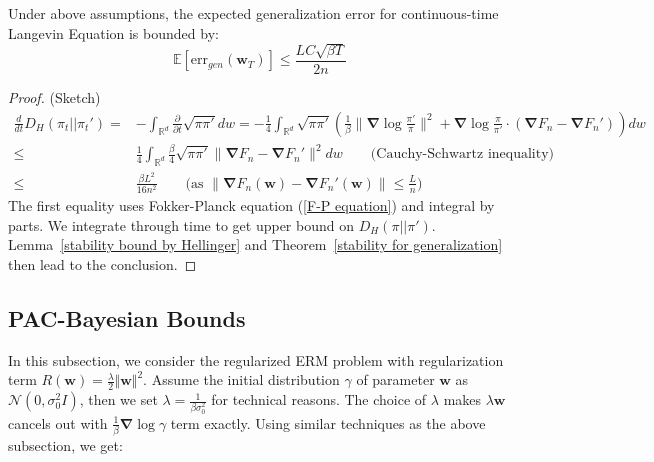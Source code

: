 \documentclass[final,12pt]{colt2018} %
\begin{document}
\begin{proposition}
\label{stability-bound-continuous}
  Under above assumptions, the expected generalization error for continuous-time Langevin Equation is bounded by:
  \begin{equation}
    \mathbb{E} [\mathrm{err}_{gen}(\bm{w}_T)]\leq \frac{LC\sqrt{\beta T}}{2n}
  \end{equation}
\end{proposition}
\begin{proof}(Sketch)
\begin{align*}
\frac{d}{dt}D_{H}(\pi_t||\pi_t')=&-\int_{\mathbb{R}^d} \frac{\partial }{\partial t}\sqrt{\pi \pi'}dw=-\frac{1}{4}\int_{\mathbb{R}^d}\sqrt{\pi \pi'}\left(\frac{1}{\beta}\|\bm{\nabla}\log\frac{\pi'}{\pi}\|^2+\bm{\nabla}\log\frac{\pi}{\pi'}\cdot(\bm{\nabla}F_n-\bm{\nabla}F_n')\right)dw\\
\leqslant & \frac{1}{4}\int_{\mathbb{R}^d}\frac{\beta}{4}\sqrt{\pi \pi'}\|\bm{\nabla}F_n-\bm{\nabla}F_n'\|^2dw \quad \quad \text{(Cauchy-Schwartz inequality)}\\
\leqslant & \frac{\beta L^2}{16n^2} \quad \quad \text{(as $\|\bm{\nabla}F_n(\bm{w})-\bm{\nabla}F_n'(\bm{w})\|\leqslant \frac{L}{n}$)}
\end{align*}
The first equality uses Fokker-Planck equation (\ref{F-P equation}) and integral by parts. We integrate through time to get upper bound on $D_H(\pi||\pi')$. Lemma~\ref{stability bound by Hellinger} and Theorem~\ref{stability for generalization} then lead to the conclusion.
\end{proof}

\subsection{PAC-Bayesian Bounds}
In this subsection, we consider the regularized ERM problem with regularization term $R(\bm{w})=\frac{\lambda}{2}\Vert \bm{w}\Vert^2$. Assume the initial distribution $\gamma$ of parameter $\bm{w}$ as $\mathcal{N}(0,\sigma_0^2I)$, then we set $\lambda=\frac{1}{\beta\sigma_0^2}$ for technical reasons. The choice of $\lambda$ makes $\lambda\bm{w}$ cancels out with $\frac{1}{\beta}\bm{\nabla}\log \gamma$ term exactly. Using similar techniques as the above subsection, we get:
\end{document}
